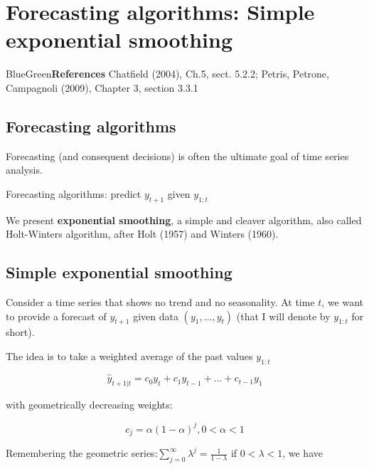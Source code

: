 \documentclass[dvipsnames,12pt]{book}
\begin{document}
    \chapter[Simple exponential smoothing]{Forecasting algorithms: Simple exponential smoothing}
    
        \begin{mybox}{BlueGreen}{\textbf{References}}
            Chatfield (2004), Ch.5, sect. 5.2.2; Petris, Petrone, Campagnoli (2009), Chapter 3, section 3.3.1
        \end{mybox}

        \section{Forecasting algorithms}

            Forecasting (and consequent decisions) is often the ultimate goal of time series analysis. 
            
            Forecasting algorithms: predict $y_{t+1}$ given $y_{1:t}$
            
            We present  \textbf{exponential smoothing}, a simple and cleaver algorithm, also called Holt-Winters algorithm, after Holt (1957) and Winters (1960).

        \section{Simple exponential smoothing}

            Consider a time series that shows no trend and no seasonality. At time $t$, we want to provide a forecast of $y_{t+1}$ given data $(y_1, \ldots, y_t)$ (that I will denote by $y_{1:t}$ for short).

            The idea is to take a weighted average of the past values $y_{1:t}$
            
            \begin{equation}
                \hat{y}_{t+1|t} = c_0 y_t + c_1 y_{t-1} + \ldots + c_{t-1} y_1
            \end{equation}

            with geometrically decreasing weights:

            \begin{equation}
                c_j= \alpha (1-\alpha)^j , 0< \alpha < 1
            \end{equation}

            Remembering the geometric series:$\sum_{j=0}^\infty \lambda^j = \frac{1}{1-\lambda}$ if $0 < \lambda < 1$, we have
\end{document}
